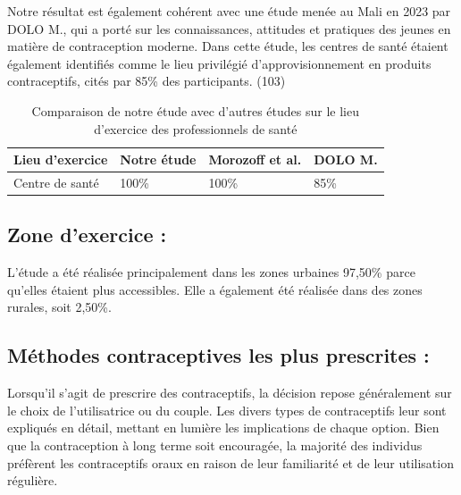 \noindent Notre résultat est également cohérent avec une étude menée au Mali en 2023 par DOLO M., qui a porté sur les connaissances, attitudes et pratiques des jeunes en matière de contraception moderne. Dans cette étude, les centres de santé étaient également identifiés comme le lieu privilégié d'approvisionnement en produits contraceptifs, cités par 85\% des participants. (103) \\


\begin{table}[H]
  \centering
  \renewcommand{\arraystretch}{1.5}

  \begin{spacing}{1.5} %
  \begin{tabularx}{\textwidth}{|X|X|X|X|}
      \hline
      \textbf{Lieu d’exercice} & \textbf{Notre étude } & \textbf{Morozoff et al.} & \textbf{DOLO M.} \\
      \hline
      Centre de santé & 100\% & 100\% & 85\% \\
      
      
      \hline
  \end{tabularx}
\end{spacing}
\captionsetup{justification=centering} %
\caption{Comparaison de notre étude avec d’autres études sur le lieu d’exercice des \hspace{2cm} professionnels de santé}

\end{table}

\subsection{Zone d’exercice :}

L’étude a été réalisée principalement dans les zones urbaines 97,50\% parce qu’elles étaient plus accessibles. Elle a également été réalisée dans des zones rurales, soit 2,50\%.    

\subsection{Méthodes contraceptives les plus prescrites : }

Lorsqu'il s'agit de prescrire des contraceptifs, la décision repose généralement sur le choix de l'utilisatrice ou du couple. Les divers types de contraceptifs leur sont expliqués en détail, mettant en lumière les implications de chaque option. Bien que la contraception à long terme soit encouragée, la majorité des individus préfèrent les contraceptifs oraux en raison de leur familiarité et de leur utilisation régulière.\\

